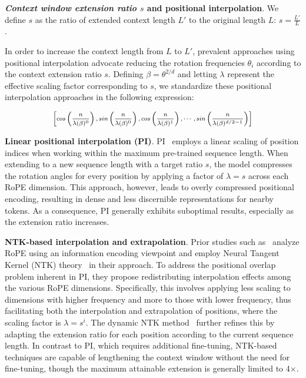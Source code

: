 \textbf{\emph{Context window extension ratio $s$} and positional interpolation}. We define $s$ as  the ratio of extended context length $L'$ to the original length $L$: $s=\frac{L'}{L}$. 

In order to increase the context length from $L$ to $L'$, prevalent approaches using positional interpolation advocate reducing the rotation frequencies $\theta_i$ according to the context extension ratio $s$. Defining $\beta = \theta^{2/d}$ and letting $\lambda$ represent the effective scaling factor corresponding to $s$, we standardize these positional interpolation approaches in the following expression:

\begin{equation}	
	\fontsize{7.5}{7.5} \selectfont
	\label{eq:unified_rope}
	\begin{aligned}
		\left[cos\left(\frac{n}{\lambda(\beta)^0}\right), sin \left(\frac{n}{\lambda(\beta)^0}\right), cos\left(\frac{n}{\lambda(\beta)^1}\right), \cdots,  sin \left(\frac{n}{\lambda(\beta)^{d/2-1}}\right) \right]   
	\end{aligned}
\end{equation}

\textbf{Linear positional interpolation (PI)}. PI~\cite{pi} employs a linear scaling of position indices when working within the maximum pre-trained sequence length. When extending to a new sequence length with a target ratio $s$, the model compresses the rotation angles for every position by applying a factor of $\lambda=s$ across each RoPE dimension. This approach, however, leads to overly compressed positional encoding, resulting in dense and less discernible representations for nearby tokens. As a consequence, PI generally exhibits suboptimal results, especially as the extension ratio increases.

\textbf{NTK-based interpolation and extrapolation}. Prior studies such as~\cite{ntk,dynamicntk} analyze RoPE using an information encoding viewpoint and employ Neural Tangent Kernel (NTK) theory~\cite{jacot2018neural,tancik2020fourier} in their approach. To address the positional overlap problem inherent in PI, they propose redistributing interpolation effects among the various RoPE dimensions. Specifically, this involves applying less scaling to dimensions with higher frequency and more to those with lower frequency, thus facilitating both the interpolation and extrapolation of positions, where the scaling factor is $\lambda=s^{i}$. The dynamic NTK method~\cite{dynamicntk} further refines this by adapting the extension ratio for each position according to the current sequence length. In contrast to PI, which requires additional fine-tuning, NTK-based techniques are capable of lengthening the context window without the need for fine-tuning, though the maximum attainable extension is generally limited to 4$\times$.

